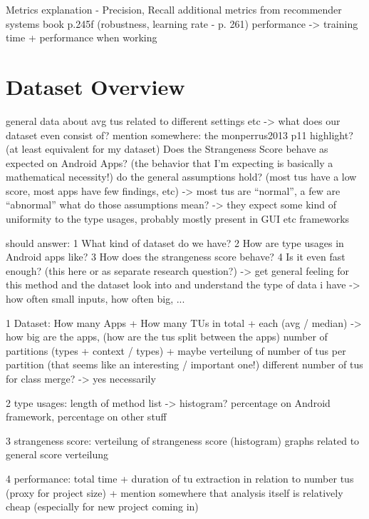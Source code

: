 Metrics explanation - Precision, Recall
    additional metrics from recommender systems book p.245f (robustness, learning rate - p. 261)
    performance -> training time + performance when working

\section{Dataset Overview}

general data about avg tus related to different settings etc -> what does our dataset even consist of?
mention somewhere: the monperrus2013 p11 highlight? (at least equivalent for my dataset)
Does the Strangeness Score behave as expected on Android Apps? (the behavior that I'm expecting is basically a mathematical necessity!)
    do the general assumptions hold? (most tus have a low score, most apps have few findings, etc)
        -> most tus are ``normal'', a few are ``abnormal''
        what do those assumptions mean? -> they expect some kind of uniformity to the type usages, probably mostly present in GUI etc frameworks

should answer:
    1 What kind of dataset do we have?
    2 How are type usages in Android apps like?
    3 How does the strangeness score behave?
    4 Is it even fast enough? (this here or as separate research question?)
-> get general feeling for this method and the dataset
look into and understand the type of data i have -> how often small inputs, how often big, ...

1 Dataset:
    How many Apps + How many TUs in total + each (avg / median) -> how big are the apps, (how are the tus split between the apps)
    number of partitions (types + context / types) + maybe verteilung of number of tus per partition (that seems like an interesting / important one!)
    different number of tus for class merge? -> yes necessarily

2 type usages:
    length of method list -> histogram?
    percentage on Android framework, percentage on other stuff

3 strangeness score:
    verteilung of strangeness score (histogram)
    graphs related to general score verteilung

4 performance:
    total time +
    duration of tu extraction in relation to number tus (proxy for project size)
    + mention somewhere that analysis itself is relatively cheap (especially for new project coming in)


